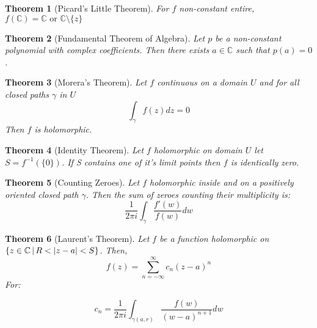 \documentclass[11pt,a4paper, titlepage]{article}
\newtheorem{theorem}{Theorem}[section]
\DeclarePairedDelimiter\abs{\lvert}{\rvert}
\theoremstyle{definition}
\begin{document}
\begin{theorem}[Picard's Little Theorem]
For $f$ non-constant entire, $f(\mathbb{C}) = \mathbb{C} \textrm{ or } \mathbb{C} \setminus \{z\} $
\end{theorem}

\begin{theorem}[Fundamental Theorem of Algebra]

Let $p$ be a non-constant polynomial with complex coefficients. Then there exists $a \in \mathbb{C}$ such that $p(a) = 0$.

\end{theorem}

\begin{theorem}[Morera's Theorem]
Let $f$ continuous on a domain $U$ and for all closed paths $\gamma$ in $U$
\[
	\int_\gamma f(z) dz = 0
\]
Then $f$ is holomorphic.
\end{theorem}


\begin{theorem}[Identity Theorem]
Let $f$ holomorphic on domain $U$ let $S = f^{-1}(\{0\})$. If S contains one of it's limit points then $f$ is identically zero.
\end{theorem}

\begin{theorem}[Counting Zeroes]
Let $f$ holomorphic inside and on a positively oriented closed path $\gamma$. Then the sum of zeroes counting their multiplicity is:
\[
	\frac{1}{2 \pi i} \int_\gamma \frac{f'(w)}{f(w)}dw 
\]
\end{theorem}

\begin{theorem}[Laurent's Theorem]

Let $f$ be a function holomorphic on $\{ z \in  \mathbb{C} \, | \, R < \abs{z - a} < S\}$. Then, 
\[
 	f(z) = \sum_{n = -\infty}^{\infty} c_n (z-a)^n
 \] 
For:

\[
	c_n = \frac{1}{2 \pi i} \int_{\gamma(a,r)} \frac{f(w)}{(w-a)^{n+1}}dw
\]
\end{theorem}
\end{document}
